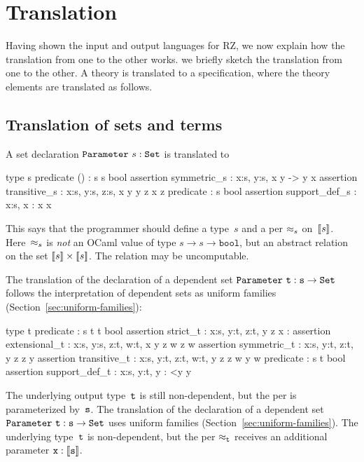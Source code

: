 \section{Translation}
\label{sec:translation}

Having shown the input and output languages for RZ,
%
\iflong
we now explain how the translation from one to the other works.
\else
we briefly sketch the translation from one to the other.
\fi
%
A theory is translated to a
specification, where the theory elements are translated as follows.



\subsection{Translation of sets and terms}
\label{sec:transl-sets-terms}

A set declaration $\mathtt{Parameter}\ s : \mathtt{Set}$ is translated to
%
\begin{source}
type s
predicate () : s \iTo s \iTo bool
assertion symmetric_s :  \iForall x:s, y:s, x  y -> y  x
assertion transitive_s : \iForall x:s, y:s, z:s, x  y \iAnd y  z \iTo x  z
predicate  : s \iTo bool
assertion support_def_s :  \iForall x:s,  x :  \iIff x  x
\end{source}
%
This says that the programmer should define a type~$s$ and a per
$\approx_s$ on~$[\![s]\!]$. Here~$\approx_s$ is \emph{not} an OCaml value
of type $s \to s \to \mathtt{bool}$, but an abstract relation on the
set $[\![s]\!] \times [\![s]\!]$.  The relation may be uncomputable.

\iflong
The translation of the declaration of a dependent set
$\mathtt{Parameter}\ \mathtt{t} : \mathtt{s} \to \mathtt{Set}$ follows the interpretation of dependent
sets as uniform families (Section~\ref{sec:uniform-families}):
%
\begin{source}
type t
predicate  : s \iTo t \iTo t \iTo bool
assertion strict_t :  \iForall x:s, y:t, z:t, y  z \iTo x : 
assertion extensional_t :
  \iForall x:s, y:s, z:t, w:t, x  y \iTo z  w \iTo z  w
assertion symmetric_t : \iForall x:s, y:t, z:t, y  z \iTo z  y
assertion transitive_t :
  \iForall x:s, y:t, z:t, w:t, y  z \iAnd z  w \iTo y  w
predicate  : s \iTo t \iTo bool
assertion support_def_t :  \iForall x:s, y:t, y :  <\iTo y  y
\end{source}
%
The underlying output type~$\mathtt{t}$ is still non-dependent, but the per is
parameterized by~$\mathtt{s}$.
\else %
The translation of the declaration of a dependent set
$\mathtt{Parameter}\ \mathtt{t} : \mathtt{s} \to \mathtt{Set}$ uses uniform families
(Section~\ref{sec:uniform-families}). The underlying type~$\mathtt{t}$ is
non-dependent, but the per $\approx_{\mathtt{t}}$ receives an additional
parameter $\mathtt{x} : [\![\mathtt{s}]\!]$.
\fi %

